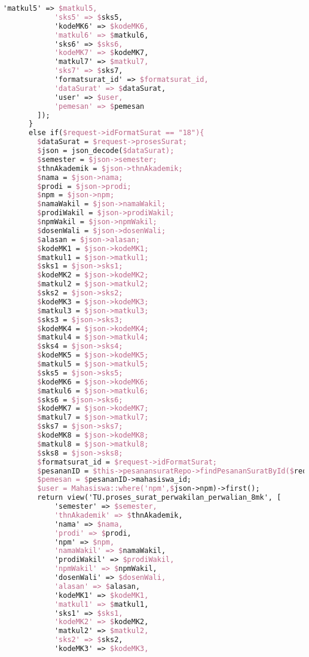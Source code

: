 \begin{lstlisting}[language=tex,basicstyle=\tiny,caption=PesanansuratController.php]
            'matkul5' => $matkul5,
            'sks5' => $sks5,
            'kodeMK6' => $kodeMK6,
            'matkul6' => $matkul6,
            'sks6' => $sks6,
            'kodeMK7' => $kodeMK7,
            'matkul7' => $matkul7,
            'sks7' => $sks7,
            'formatsurat_id' => $formatsurat_id,
            'dataSurat' => $dataSurat,
            'user' => $user,
            'pemesan' => $pemesan
        ]);
      }
      else if($request->idFormatSurat == "18"){
        $dataSurat = $request->prosesSurat;
        $json = json_decode($dataSurat);
        $semester = $json->semester;
        $thnAkademik = $json->thnAkademik;
        $nama = $json->nama;
        $prodi = $json->prodi;
        $npm = $json->npm;
        $namaWakil = $json->namaWakil;
        $prodiWakil = $json->prodiWakil;
        $npmWakil = $json->npmWakil;
        $dosenWali = $json->dosenWali;
        $alasan = $json->alasan;
        $kodeMK1 = $json->kodeMK1;
        $matkul1 = $json->matkul1;
        $sks1 = $json->sks1;
        $kodeMK2 = $json->kodeMK2;
        $matkul2 = $json->matkul2;
        $sks2 = $json->sks2;
        $kodeMK3 = $json->kodeMK3;
        $matkul3 = $json->matkul3;
        $sks3 = $json->sks3;
        $kodeMK4 = $json->kodeMK4;
        $matkul4 = $json->matkul4;
        $sks4 = $json->sks4;
        $kodeMK5 = $json->kodeMK5;
        $matkul5 = $json->matkul5;
        $sks5 = $json->sks5;
        $kodeMK6 = $json->kodeMK6;
        $matkul6 = $json->matkul6;
        $sks6 = $json->sks6;
        $kodeMK7 = $json->kodeMK7;
        $matkul7 = $json->matkul7;
        $sks7 = $json->sks7;
        $kodeMK8 = $json->kodeMK8;
        $matkul8 = $json->matkul8;
        $sks8 = $json->sks8;
        $formatsurat_id = $request->idFormatSurat;
        $pesananID = $this->pesanansuratRepo->findPesananSuratById($request->id);
        $pemesan = $pesananID->mahasiswa_id;
        $user = Mahasiswa::where('npm',$json->npm)->first();
        return view('TU.proses_surat_perwakilan_perwalian_8mk', [
            'semester' => $semester,
            'thnAkademik' => $thnAkademik,
            'nama' => $nama,
            'prodi' => $prodi,
            'npm' => $npm,
            'namaWakil' => $namaWakil,
            'prodiWakil' => $prodiWakil,
            'npmWakil' => $npmWakil,
            'dosenWali' => $dosenWali,
            'alasan' => $alasan,
            'kodeMK1' => $kodeMK1,
            'matkul1' => $matkul1,
            'sks1' => $sks1,
            'kodeMK2' => $kodeMK2,
            'matkul2' => $matkul2,
            'sks2' => $sks2,
            'kodeMK3' => $kodeMK3,

\end{lstlisting}
